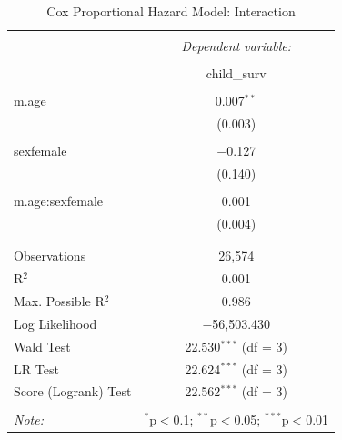 \documentclass[12pt,letterpaper]{article}
\begin{document}
\begin{table}[!htbp!] \centering 
	\caption{Cox Proportional Hazard Model: Interaction} 
	\label{} 
	\begin{tabular}{@{\extracolsep{3pt}}lc} 
		\\[-1.8ex]\hline 
		\hline \\[-1.8ex] 
		& \multicolumn{1}{c}{\textit{Dependent variable:}} \\ 
		\cline{2-2} 
		\\[-1.8ex] & child\_surv \\ 
		\hline \\[-1.8ex] 
		m.age & 0.007$^{**}$ \\ 
		& (0.003) \\ 
		& \\ 
		sexfemale & $-$0.127 \\ 
		& (0.140) \\ 
		& \\ 
		m.age:sexfemale & 0.001 \\ 
		& (0.004) \\ 
		& \\ 
		\hline \\[-1.8ex] 
		Observations & 26,574 \\ 
		R$^{2}$ & 0.001 \\ 
		Max. Possible R$^{2}$ & 0.986 \\ 
		Log Likelihood & $-$56,503.430 \\ 
		Wald Test & 22.530$^{***}$ (df = 3) \\ 
		LR Test & 22.624$^{***}$ (df = 3) \\ 
		Score (Logrank) Test & 22.562$^{***}$ (df = 3) \\ 
		\hline 
		\hline \\[-1.8ex] 
		\textit{Note:}  & \multicolumn{1}{r}{$^{*}$p$<$0.1; $^{**}$p$<$0.05; $^{***}$p$<$0.01} \\ 
	\end{tabular} 
\end{table} 
\end{document}
